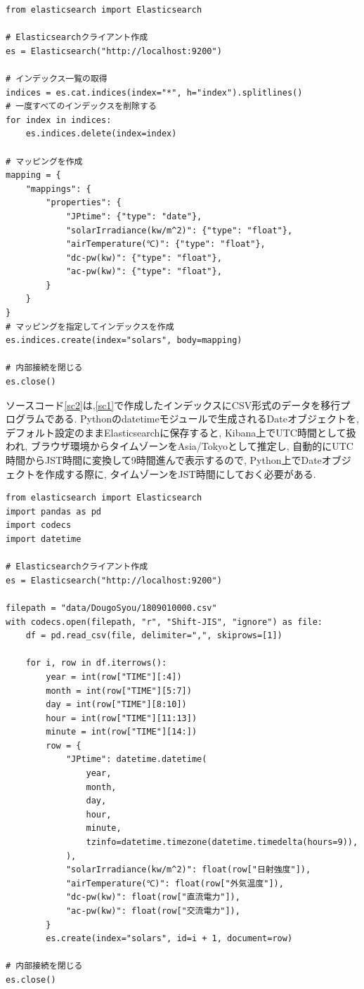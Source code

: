 \documentclass[a4j,12pt,]{jarticle}
\begin{document}
\begin{lstlisting}[caption=太陽光発電データを保存する為のインデックスを作成するプログラム, label=sc1]
from elasticsearch import Elasticsearch

# Elasticsearchクライアント作成
es = Elasticsearch("http://localhost:9200")

# インデックス一覧の取得
indices = es.cat.indices(index="*", h="index").splitlines()
# 一度すべてのインデックスを削除する
for index in indices:
    es.indices.delete(index=index)

# マッピングを作成
mapping = {
    "mappings": {
        "properties": {
            "JPtime": {"type": "date"},
            "solarIrradiance(kw/m^2)": {"type": "float"},
            "airTemperature(℃)": {"type": "float"},
            "dc-pw(kw)": {"type": "float"},
            "ac-pw(kw)": {"type": "float"},
        }
    }
}
# マッピングを指定してインデックスを作成
es.indices.create(index="solars", body=mapping)

# 内部接続を閉じる
es.close()
\end{lstlisting}
ソースコード\ref{sc2}は,\ref{sc1}で作成したインデックスにCSV形式のデータを移行プログラムである.
Pythonのdatetimeモジュールで生成されるDateオブジェクトを, デフォルト設定のままElasticsearchに保存すると, Kibana上でUTC時間として扱われ, ブラウザ環境からタイムゾーンをAsia/Tokyoとして推定し, 自動的にUTC時間からJST時間に変換して9時間進んで表示するので, Python上でDateオブジェクトを作成する際に, タイムゾーンをJST時間にしておく必要がある.

\begin{lstlisting}[caption=CSV形式の太陽光発電データをElasticsearchサーバーに移行するプログラム, label=sc2]
from elasticsearch import Elasticsearch
import pandas as pd
import codecs
import datetime

# Elasticsearchクライアント作成
es = Elasticsearch("http://localhost:9200")

filepath = "data/DougoSyou/1809010000.csv"
with codecs.open(filepath, "r", "Shift-JIS", "ignore") as file:
    df = pd.read_csv(file, delimiter=",", skiprows=[1])

    for i, row in df.iterrows():
        year = int(row["TIME"][:4])
        month = int(row["TIME"][5:7])
        day = int(row["TIME"][8:10])
        hour = int(row["TIME"][11:13])
        minute = int(row["TIME"][14:])
        row = {
            "JPtime": datetime.datetime(
                year,
                month,
                day,
                hour,
                minute,
                tzinfo=datetime.timezone(datetime.timedelta(hours=9)),
            ),
            "solarIrradiance(kw/m^2)": float(row["日射強度"]),
            "airTemperature(℃)": float(row["外気温度"]),
            "dc-pw(kw)": float(row["直流電力"]),
            "ac-pw(kw)": float(row["交流電力"]),
        }
        es.create(index="solars", id=i + 1, document=row)

# 内部接続を閉じる
es.close()
\end{lstlisting}
\end{document}
